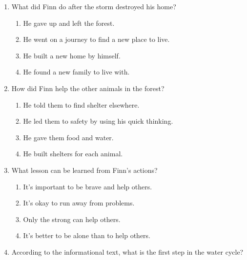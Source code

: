 \documentclass[12pt]{article}
\begin{document}
\begin{enumerate}

    \item What did Finn do after the storm destroyed his home?

    \begin{enumerate}[label=\Alph*.]
        \item He gave up and left the forest.
        \item He went on a journey to find a new place to live.
        \item He built a new home by himself.
        \item He found a new family to live with.
    \end{enumerate}

    \vspace{0.5cm}

    \item How did Finn help the other animals in the forest?

    \begin{enumerate}[label=\Alph*.]
        \item He told them to find shelter elsewhere.
        \item He led them to safety by using his quick thinking.
        \item He gave them food and water.
        \item He built shelters for each animal.
    \end{enumerate}

    \vspace{0.5cm}

    \item What lesson can be learned from Finn’s actions?

    \begin{enumerate}[label=\Alph*.]
        \item It’s important to be brave and help others.
        \item It’s okay to run away from problems.
        \item Only the strong can help others.
        \item It’s better to be alone than to help others.
    \end{enumerate}

    \vspace{0.5cm}

    \item According to the informational text, what is the first step in the water cycle?


\end{enumerate}
\end{document}
